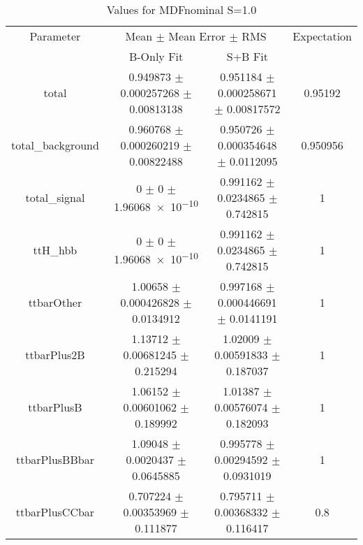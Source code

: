 \begin{table}
\centering
\caption{Values for MDFnominal S=1.0}
\begin{tabular}{cccc}
\toprule
Parameter & \multicolumn{2}{c}{Mean $\pm$ Mean Error $\pm$ RMS} & Expectation\\
 & B-Only Fit & S+B Fit & \\
\midrule
total & \num{0.949873} $\pm$ \num{0.000257268} $\pm$ \num{0.00813138} & \num{0.951184} $\pm$ \num{0.000258671} $\pm$ \num{0.00817572} & \num{0.95192}\\
total\_background & \num{0.960768} $\pm$ \num{0.000260219} $\pm$ \num{0.00822488} & \num{0.950726} $\pm$ \num{0.000354648} $\pm$ \num{0.0112095} & \num{0.950956}\\
total\_signal & \num{0} $\pm$ \num{0} $\pm$ \num{1.96068e-10} & \num{0.991162} $\pm$ \num{0.0234865} $\pm$ \num{0.742815} & \num{1}\\
ttH\_hbb & \num{0} $\pm$ \num{0} $\pm$ \num{1.96068e-10} & \num{0.991162} $\pm$ \num{0.0234865} $\pm$ \num{0.742815} & \num{1}\\
ttbarOther & \num{1.00658} $\pm$ \num{0.000426828} $\pm$ \num{0.0134912} & \num{0.997168} $\pm$ \num{0.000446691} $\pm$ \num{0.0141191} & \num{1}\\
ttbarPlus2B & \num{1.13712} $\pm$ \num{0.00681245} $\pm$ \num{0.215294} & \num{1.02009} $\pm$ \num{0.00591833} $\pm$ \num{0.187037} & \num{1}\\
ttbarPlusB & \num{1.06152} $\pm$ \num{0.00601062} $\pm$ \num{0.189992} & \num{1.01387} $\pm$ \num{0.00576074} $\pm$ \num{0.182093} & \num{1}\\
ttbarPlusBBbar & \num{1.09048} $\pm$ \num{0.0020437} $\pm$ \num{0.0645885} & \num{0.995778} $\pm$ \num{0.00294592} $\pm$ \num{0.0931019} & \num{1}\\
ttbarPlusCCbar & \num{0.707224} $\pm$ \num{0.00353969} $\pm$ \num{0.111877} & \num{0.795711} $\pm$ \num{0.00368332} $\pm$ \num{0.116417} & \num{0.8}\\
\bottomrule
\end{tabular}
\end{table}